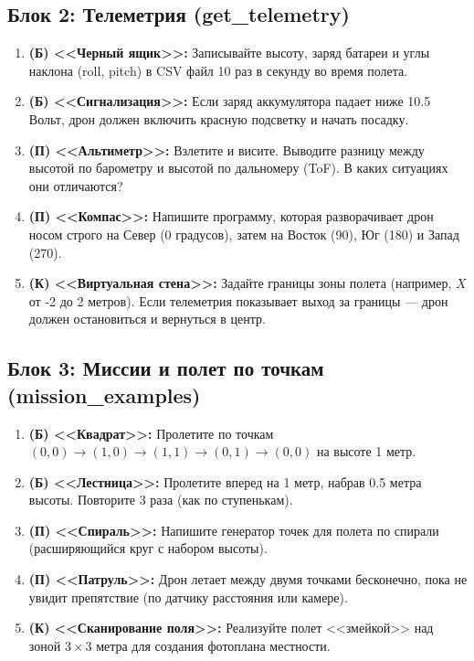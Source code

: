 \subsection{Блок 2: Телеметрия (get\_telemetry)}

\begin{enumerate}
    \item \textbf{(Б) <<Черный ящик>>:} Записывайте высоту, заряд батареи и углы наклона (roll, pitch) в CSV файл 10 раз в секунду во время полета.
    \item \textbf{(Б) <<Сигнализация>>:} Если заряд аккумулятора падает ниже 10.5 Вольт, дрон должен включить красную подсветку и начать посадку.
    \item \textbf{(П) <<Альтиметр>>:} Взлетите и висите. Выводите разницу между высотой по барометру и высотой по дальномеру (ToF). В каких ситуациях они отличаются?
    \item \textbf{(П) <<Компас>>:} Напишите программу, которая разворачивает дрон носом строго на Север (0 градусов), затем на Восток (90), Юг (180) и Запад (270).
    \item \textbf{(К) <<Виртуальная стена>>:} Задайте границы зоны полета (например, $X$ от -2 до 2 метров). Если телеметрия показывает выход за границы — дрон должен остановиться и вернуться в центр.
\end{enumerate}

\subsection{Блок 3: Миссии и полет по точкам (mission\_examples)}

\begin{enumerate}
    \item \textbf{(Б) <<Квадрат>>:} Пролетите по точкам $(0,0) \to (1,0) \to (1,1) \to (0,1) \to (0,0)$ на высоте 1 метр.
    \item \textbf{(Б) <<Лестница>>:} Пролетите вперед на 1 метр, набрав 0.5 метра высоты. Повторите 3 раза (как по ступенькам).
    \item \textbf{(П) <<Спираль>>:} Напишите генератор точек для полета по спирали (расширяющийся круг с набором высоты).
    \item \textbf{(П) <<Патруль>>:} Дрон летает между двумя точками бесконечно, пока не увидит препятствие (по датчику расстояния или камере).
    \item \textbf{(К) <<Сканирование поля>>:} Реализуйте полет <<змейкой>> над зоной $3 \times 3$ метра для создания фотоплана местности.
\end{enumerate}

